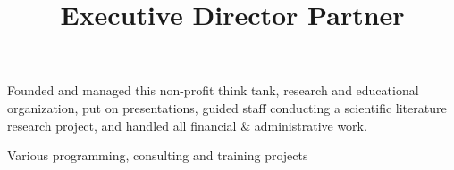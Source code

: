 \documentclass[line,margin]{res}
\begin{document}
\begin{resume}
\title{ Executive Director }
\begin{position}
Founded and managed this non-profit think tank, research and educational 
organization, put on presentations, guided staff conducting a scientific 
literature research project, and handled all financial \& administrative work.
\end{position}


\title{ Partner }
\begin{position}
Various programming, consulting and training projects

\end{position}







\end{resume}
\end{document}
